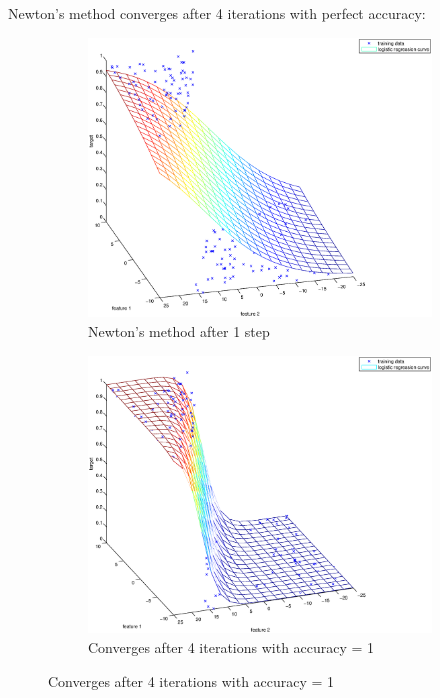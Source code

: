 \documentclass{article}
\begin{document}
	Newton's method converges after 4 iterations with perfect accuracy:
	\begin{figure}[h]
		\centering
		\begin{subfigure}{.5\textwidth}
			\centering
			\includegraphics[width=.9\linewidth]{testdataset_newton_start.eps}
			\caption{Newton's method after 1 step}
			\label{fig:sub1}
		\end{subfigure}%
		\begin{subfigure}{.5\textwidth}
			\centering
			\includegraphics[width=.9\linewidth]{testdataset_newton_end.eps}
			\caption{Converges after 4 iterations with accuracy = 1}
			\label{fig:sub2}
		\end{subfigure}
	\end{figure}
\end{document}

